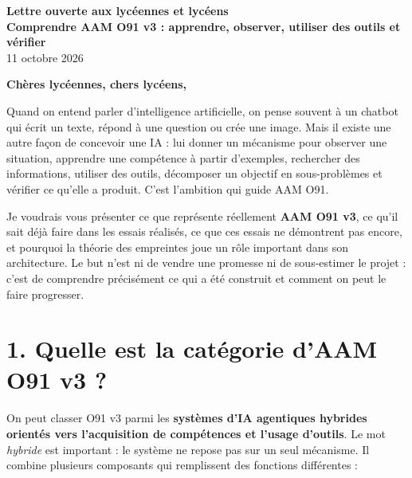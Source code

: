 \documentclass[11pt,a4paper]{article}
\begin{document}
\begin{center}
{\Large\bfseries\color{AAMBlue} Lettre ouverte aux lycéennes et lycéens}\\[3pt]
{\LARGE\bfseries Comprendre AAM O91 v3 : apprendre, observer, utiliser des outils et vérifier}\\[7pt]
{\normalsize 11 octobre 2026}
\end{center}

\vspace{4pt}
\noindent\textbf{Chères lycéennes, chers lycéens,}

Quand on entend parler d'intelligence artificielle, on pense souvent à un chatbot qui écrit un texte, répond à une question ou crée une image. Mais il existe une autre façon de concevoir une IA : lui donner un mécanisme pour observer une situation, apprendre une compétence à partir d'exemples, rechercher des informations, utiliser des outils, décomposer un objectif en sous-problèmes et vérifier ce qu'elle a produit. C'est l'ambition qui guide AAM O91.

Je voudrais vous présenter ce que représente réellement \textbf{AAM O91 v3}, ce qu'il sait déjà faire dans les essais réalisés, ce que ces essais ne démontrent pas encore, et pourquoi la théorie des empreintes joue un rôle important dans son architecture. Le but n'est ni de vendre une promesse ni de sous-estimer le projet : c'est de comprendre précisément ce qui a été construit et comment on peut le faire progresser.

\begin{center}
\end{center}

\section*{1. Quelle est la catégorie d'AAM O91 v3 ?}

On peut classer O91 v3 parmi les \textbf{systèmes d'IA agentiques hybrides orientés vers l'acquisition de compétences et l'usage d'outils}. Le mot \emph{hybride} est important : le système ne repose pas sur un seul mécanisme. Il combine plusieurs composants qui remplissent des fonctions différentes :
\end{document}
